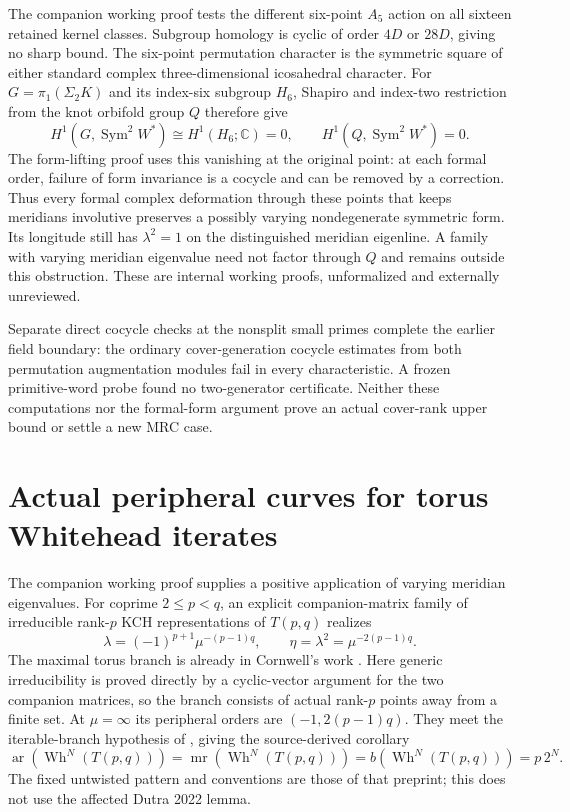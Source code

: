 \documentclass[11pt]{article}
\newcommand{\mr}{\operatorname{mr}}
\begin{document}
The companion working proof
 tests the
different six-point $A_5$ action on all sixteen retained kernel
classes. Subgroup homology is cyclic of order $4D$ or $28D$,
giving no sharp bound. The six-point permutation character is the
symmetric square of either standard complex three-dimensional
icosahedral character. For $G=\pi_1(\Sigma_2K)$ and its index-six
subgroup $H_6$, Shapiro and index-two restriction from the knot
orbifold group $Q$ therefore give
\[
 H^1(G,\operatorname{Sym}^2W^*)\cong H^1(H_6;\mathbb C)=0,
 \qquad H^1(Q,\operatorname{Sym}^2W^*)=0.
\]
The form-lifting proof uses this vanishing at the original point:
at each formal order, failure of form invariance is a cocycle and
can be removed by a correction. Thus every formal complex
deformation through these points that keeps meridians involutive
preserves a possibly varying nondegenerate symmetric form. Its
longitude still has $\lambda^2=1$ on the distinguished meridian
eigenline. A family with varying meridian eigenvalue need not factor
through $Q$ and remains outside this obstruction. These are internal
working proofs, unformalized and externally unreviewed.

Separate direct cocycle checks at the nonsplit small primes complete
the earlier field boundary: the ordinary cover-generation cocycle
estimates from both permutation augmentation modules fail in every
characteristic. A frozen primitive-word probe found no two-generator
certificate. Neither these computations nor the formal-form argument
prove an actual cover-rank upper bound or settle a new MRC case.

\clearpage
\section{Actual peripheral curves for torus Whitehead iterates}

The companion working proof
 supplies a positive
application of varying meridian eigenvalues. For coprime
$2\le p<q$, an explicit companion-matrix family of irreducible
rank-$p$ KCH representations of $T(p,q)$ realizes
\[
 \lambda=(-1)^{p+1}\mu^{-(p-1)q},\qquad
 \eta=\lambda^2=\mu^{-2(p-1)q}.
\]
The maximal torus branch is already in Cornwell's work
\cite[Section~5.1]{cornwell}. Here generic irreducibility is proved
directly by a cyclic-vector argument for the two companion matrices,
so the branch consists of actual rank-$p$ points away from a finite
set. At $\mu=\infty$ its peripheral orders are $(-1,2(p-1)q)$.
They meet the iterable-branch hypothesis of
\cite[Definition~4.1 and Corollary~4.5]{whitehead}, giving the
source-derived corollary
\[
 \operatorname{ar}(\operatorname{Wh}^N(T(p,q)))
 =\mr(\operatorname{Wh}^N(T(p,q)))
 =b(\operatorname{Wh}^N(T(p,q)))=p\,2^N.
\]
The fixed untwisted pattern and conventions are those of that
preprint; this does not use the affected Dutra 2022 lemma.
\end{document}
